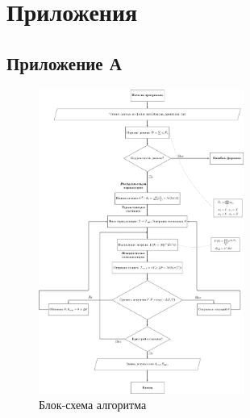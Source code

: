 \documentclass[a4paper]{report}
\begin{document}

\chapter*{Приложения}
\section*{Приложение А}
\begin{figure}[ht]
\centering
\includegraphics[width=0.6\textwidth]{figures/scheme.pdf}
\caption{Блок-схема алгоритма}
\label{fig:flowchart}
\end{figure}
\end{document}
